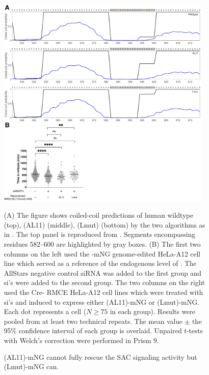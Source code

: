 \begin{figure}
    \centering
    \includegraphics[width=0.95\textwidth]{chapters/figures/AL11+Lmut.pdf}
    \caption{(AL11)-mNG cannot fully rescue the SAC signaling activity but (Lmut)-mNG can.}
    \noindent\justifying (A) The figure shows coiled-coil predictions of human wildtype  (top), (AL11) (middle), (Lmut) (bottom) by the two algorithms as in . The top panel is reproduced from . Segments encompassing residues 582--600 are highlighted by gray boxes. (B) The first two columns on the left used the -mNG genome-edited HeLa-A12 cell line which served as a reference of the endogenous level of . The AllStars negative control siRNA was added to the first group and si's were added to the second group. The two columns on the right used the Cre- RMCE HeLa-A12 cell lines which were treated with si's and induced to express either (AL11)-mNG or (Lmut)-mNG. Each dot represents a cell ($N \geq 75$ in each group). Results were pooled from at least two technical repeats. The mean value $\pm$ the 95\% confidence interval of each group is overlaid. Unpaired $t$-tests with Welch's correction were performed in Prism 9.
    \label{AL11+Lmut}
\end{figure}

